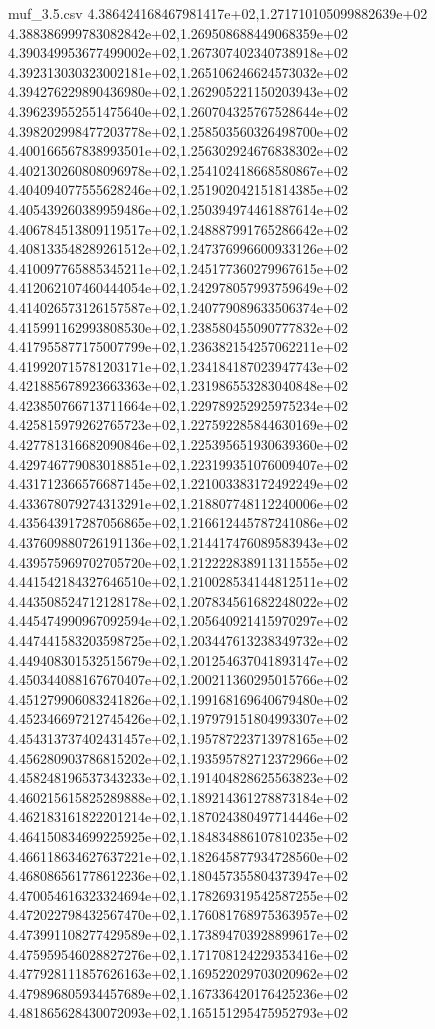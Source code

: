 \begin{filecontents*}{muf_3.5.csv}
4.386424168467981417e+02,1.271710105099882639e+02
4.388386999783082842e+02,1.269508688449068359e+02
4.390349953677499002e+02,1.267307402340738918e+02
4.392313030323002181e+02,1.265106246624573032e+02
4.394276229890436980e+02,1.262905221150203943e+02
4.396239552551475640e+02,1.260704325767528644e+02
4.398202998477203778e+02,1.258503560326498700e+02
4.400166567838993501e+02,1.256302924676838302e+02
4.402130260808096978e+02,1.254102418668580867e+02
4.404094077555628246e+02,1.251902042151814385e+02
4.405439260389959486e+02,1.250394974461887614e+02
4.406784513809119517e+02,1.248887991765286642e+02
4.408133548289261512e+02,1.247376996600933126e+02
4.410097765885345211e+02,1.245177360279967615e+02
4.412062107460444054e+02,1.242978057993759649e+02
4.414026573126157587e+02,1.240779089633506374e+02
4.415991162993808530e+02,1.238580455090777832e+02
4.417955877175007799e+02,1.236382154257062211e+02
4.419920715781203171e+02,1.234184187023947743e+02
4.421885678923663363e+02,1.231986553283040848e+02
4.423850766713711664e+02,1.229789252925975234e+02
4.425815979262765723e+02,1.227592285844630169e+02
4.427781316682090846e+02,1.225395651930639360e+02
4.429746779083018851e+02,1.223199351076009407e+02
4.431712366576687145e+02,1.221003383172492249e+02
4.433678079274313291e+02,1.218807748112240006e+02
4.435643917287056865e+02,1.216612445787241086e+02
4.437609880726191136e+02,1.214417476089583943e+02
4.439575969702705720e+02,1.212222838911311555e+02
4.441542184327646510e+02,1.210028534144812511e+02
4.443508524712128178e+02,1.207834561682248022e+02
4.445474990967092594e+02,1.205640921415970297e+02
4.447441583203598725e+02,1.203447613238349732e+02
4.449408301532515679e+02,1.201254637041893147e+02
4.450344088167670407e+02,1.200211360295015766e+02
4.451279906083241826e+02,1.199168169640679480e+02
4.452346697212745426e+02,1.197979151804993307e+02
4.454313737402431457e+02,1.195787223713978165e+02
4.456280903786815202e+02,1.193595782712372966e+02
4.458248196537343233e+02,1.191404828625563823e+02
4.460215615825289888e+02,1.189214361278873184e+02
4.462183161822201214e+02,1.187024380497714446e+02
4.464150834699225925e+02,1.184834886107810235e+02
4.466118634627637221e+02,1.182645877934728560e+02
4.468086561778612236e+02,1.180457355804373947e+02
4.470054616323324694e+02,1.178269319542587255e+02
4.472022798432567470e+02,1.176081768975363957e+02
4.473991108277429589e+02,1.173894703928899617e+02
4.475959546028827276e+02,1.171708124229353416e+02
4.477928111857626163e+02,1.169522029703020962e+02
4.479896805934457689e+02,1.167336420176425236e+02
4.481865628430072093e+02,1.165151295475952793e+02

\end{filecontents*}

